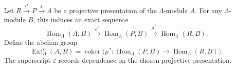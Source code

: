 Let $R \xrightarrow{\mu} P \xrightarrow{\varepsilon} A$ be a projective presentation of the $\Lambda$-module $A$. For any $\Lambda$-module $B$, this induces an exact sequence
$$\operatorname{Hom}_{\Lambda}(A, B) \xrightarrow{\varepsilon^*} \operatorname{Hom}_{\Lambda}(P, B) \xrightarrow{\mu^*} \operatorname{Hom}_{\Lambda}(R, B).$$
Define the abelian group
$$\operatorname{Ext}_{\Lambda}^{\varepsilon}(A, B) = \operatorname{coker}\bigl(\mu^* : \operatorname{Hom}_{\Lambda}(P, B) \to \operatorname{Hom}_{\Lambda}(R, B)\bigr).$$
The superscript $\varepsilon$ records dependence on the chosen projective presentation.
